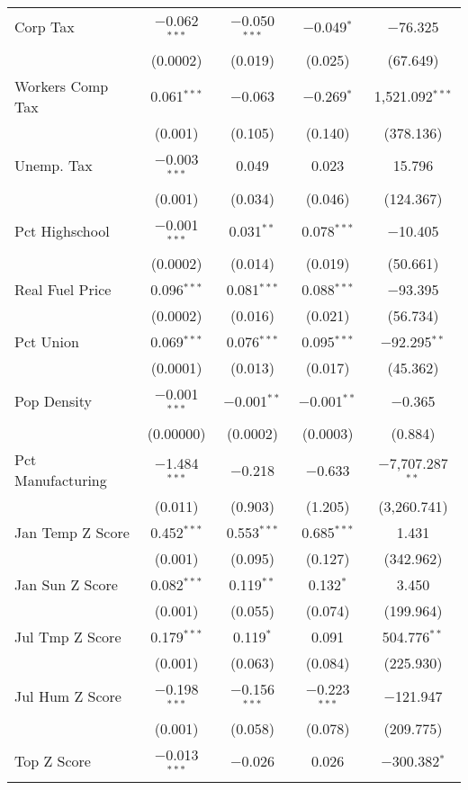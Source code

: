 \begin{table}[!htbp]
\begin{tabular}{@{\extracolsep{5pt}}lcccc}
  Corp Tax & $-$0.062$^{***}$ & $-$0.050$^{***}$ & $-$0.049$^{*}$ & $-$76.325 \\ 
  & (0.0002) & (0.019) & (0.025) & (67.649) \\ 
  Workers Comp Tax & 0.061$^{***}$ & $-$0.063 & $-$0.269$^{*}$ & 1,521.092$^{***}$ \\ 
  & (0.001) & (0.105) & (0.140) & (378.136) \\ 
  Unemp. Tax & $-$0.003$^{***}$ & 0.049 & 0.023 & 15.796 \\ 
  & (0.001) & (0.034) & (0.046) & (124.367) \\ 
  Pct Highschool & $-$0.001$^{***}$ & 0.031$^{**}$ & 0.078$^{***}$ & $-$10.405 \\ 
  & (0.0002) & (0.014) & (0.019) & (50.661) \\ 
  Real Fuel Price & 0.096$^{***}$ & 0.081$^{***}$ & 0.088$^{***}$ & $-$93.395 \\ 
  & (0.0002) & (0.016) & (0.021) & (56.734) \\ 
  Pct Union & 0.069$^{***}$ & 0.076$^{***}$ & 0.095$^{***}$ & $-$92.295$^{**}$ \\ 
  & (0.0001) & (0.013) & (0.017) & (45.362) \\ 
  Pop Density & $-$0.001$^{***}$ & $-$0.001$^{**}$ & $-$0.001$^{**}$ & $-$0.365 \\ 
  & (0.00000) & (0.0002) & (0.0003) & (0.884) \\ 
  Pct Manufacturing & $-$1.484$^{***}$ & $-$0.218 & $-$0.633 & $-$7,707.287$^{**}$ \\ 
  & (0.011) & (0.903) & (1.205) & (3,260.741) \\ 
  Jan Temp Z Score & 0.452$^{***}$ & 0.553$^{***}$ & 0.685$^{***}$ & 1.431 \\ 
  & (0.001) & (0.095) & (0.127) & (342.962) \\ 
  Jan Sun Z Score & 0.082$^{***}$ & 0.119$^{**}$ & 0.132$^{*}$ & 3.450 \\ 
  & (0.001) & (0.055) & (0.074) & (199.964) \\ 
  Jul Tmp Z Score & 0.179$^{***}$ & 0.119$^{*}$ & 0.091 & 504.776$^{**}$ \\ 
  & (0.001) & (0.063) & (0.084) & (225.930) \\ 
  Jul Hum Z Score & $-$0.198$^{***}$ & $-$0.156$^{***}$ & $-$0.223$^{***}$ & $-$121.947 \\ 
  & (0.001) & (0.058) & (0.078) & (209.775) \\ 
  Top Z Score & $-$0.013$^{***}$ & $-$0.026 & 0.026 & $-$300.382$^{*}$ \\ 

\end{tabular}
\end{table}
